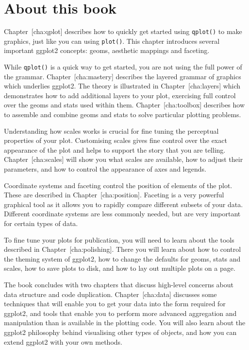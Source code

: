 \section{About this book}

Chapter~{[}cha:qplot{]} describes how to quickly get started using
\texttt{qplot()} to make graphics, just like you can using
\texttt{plot()}. This chapter introduces several important ggplot2
concepts: geoms, aesthetic mappings and faceting.

While \texttt{qplot()} is a quick way to get started, you are not using
the full power of the grammar. Chapter~{[}cha:mastery{]} describes the
layered grammar of graphics which underlies ggplot2. The theory is
illustrated in Chapter~{[}cha:layers{]} which demonstrates how to add
additional layers to your plot, exercising full control over the geoms
and stats used within them. Chapter~{[}cha:toolbox{]} describes how to
assemble and combine geoms and stats to solve particular plotting
problems.

Understanding how scales works is crucial for fine tuning the perceptual
properties of your plot. Customising scales gives fine control over the
exact appearance of the plot and helps to support the story that you are
telling. Chapter~{[}cha:scales{]} will show you what scales are
available, how to adjust their parameters, and how to control the
appearance of axes and legends.

Coordinate systems and faceting control the position of elements of the
plot. These are described in Chapter~{[}cha:position{]}. Faceting is a
very powerful graphical tool as it allows you to rapidly compare
different subsets of your data. Different coordinate systems are less
commonly needed, but are very important for certain types of data.

To fine tune your plots for publication, you will need to learn about
the tools described in Chapter~{[}cha:polishing{]}. There you will learn
about how to control the theming system of ggplot2, how to change the
defaults for geoms, stats and scales, how to save plots to disk, and how
to lay out multiple plots on a page.

The book concludes with two chapters that discuss high-level concerns
about data structure and code duplication. Chapter~{[}cha:data{]}
discusses some techniques that will enable you to get your data into the
form required for ggplot2, and tools that enable you to perform more
advanced aggregation and manipulation than is available in the plotting
code. You will also learn about the ggplot2 philosophy behind
visualising other types of objects, and how you can extend ggplot2 with
your own methods.


